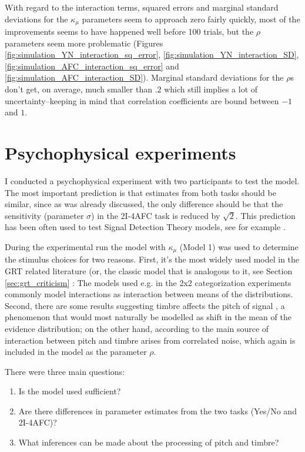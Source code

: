 \documentclass{article}\usepackage{knitr}
\begin{document}
With regard to the interaction terms, squared errors and marginal standard deviations for the $\kappa_{\mu}$ parameters seem to approach zero fairly quickly, most of the improvements seems to have happened well before 100 trials, but the $\rho$ parameters seem more problematic (Figures \ref{fig:simulation_YN_interaction_sq_error}, \ref{fig:simulation_YN_interaction_SD}, \ref{fig:simulation_AFC_interaction_sq_error} and \ref{fig:simulation_AFC_interaction_SD}). Marginal standard deviations for the $\rho$s don't get, on average, much smaller than $.2$ which still implies a lot of uncertainty--keeping in mind that correlation coefficients are bound between $-1$ and $1$.

\newpage


\section{Psychophysical experiments}
\label{sec:pp_exp}

I conducted a psychophysical experiment with two participants to test the model. The most important prediction is that estimates from both tasks should be similar, since as was already discussed, the only difference should be that the sensitivity (parameter $\sigma$) in the 2I-4AFC task is reduced by $\sqrt{2}$. This prediction has been often used to test Signal Detection Theory models, see for example \citet{wickens2002}.  

During the experimental run the model with $\kappa_{\mu}$ (Model 1) was used to determine the stimulus choices for two reasons. First, it's the most widely used model in the GRT related literature (or, the classic model that is analogous to it, see Section \ref{sec:grt_criticism} \textit{}: The models used e.g. in the 2x2 categorization experiments commonly model interactions as interaction between means of the distributions. Second, there are some results suggesting timbre affects the pitch of signal \citep{allen2014, platt1985}, a phenomenon that would most naturally be modelled as shift in the mean of the evidence distribution; on the other hand, according to \cite{silbert2009} the main source of interaction between pitch and timbre arises from correlated noise, which again is included in the model as the parameter $\rho$.

There were three main questions: 

\begin{enumerate}
  \item Is the model used sufficient? 
  \item Are there differences in parameter estimates from the two tasks (Yes/No and 2I-4AFC)?
  \item What inferences can be made about the processing of pitch and timbre?
\end{enumerate}
 
\end{document}
